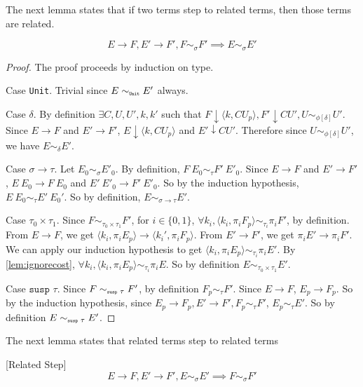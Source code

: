 The next lemma states that if two terms step to related terms, then those terms are related.
\begin{lemma}
  \label{lem:relatedstepback}
  \[
    E \to F, E' \to F', F \sim_\sigma F' \implies E \sim_\sigma E'
  \]
\end{lemma}
\begin{proof}
  The proof proceeds by induction on type.
  
  Case \texttt{Unit}. Trivial since $E \sim_{\texttt{\tiny{Unit}}} E'$ always.

  Case $\delta$.
  By definition $\exists C, U, U', k, k'$ such that $F \downarrow \langle k, C U_p \rangle, F' \downarrow C U', U \sim_{\phi[\delta]} U'$.
  Since $E \to F$ and $E' \to F'$, $E \downarrow \langle k, C U_p \rangle$ and $E' \downarrow C U'$.
  Therefore since $U \sim_{\phi[\delta]} U'$, we have $E \sim_\delta E'$.

  Case $\sigma \to \tau$.
  Let $E_0 \sim_\sigma E'_0$.
  By definition, $F\ E_0 \sim_\tau F'\ E'_0$.
  Since $E \to F$ and $E' \to F'$, $E\ E_0 \to F\ E_0$ and $E'\ E'_0 \to F'\ E'_0$.
  So by the induction hypothesis, $E\ E_0 \sim_\tau E'\ E_0'$.
  So by definition, $E \sim_{\sigma \to \tau} E'$.

  Case $\tau_0 \times \tau_1$.
  Since $F \sim_{\tau_0 \times \tau_1} F'$, for $i\in\{0, 1\}$,  $\forall k_i, \langle k_i, \pi_i F_p \rangle \sim_{\tau_i} \pi_i F'$, by definition.
  From $E \to F$, we get $\langle k_i, \pi_i E_p \rangle \to \langle k_i', \pi_i F_p \rangle$.
  From $E' \to F'$, we get $\pi_i E' \to \pi_i F'$.
  We can apply our induction hypothesis to get $\langle k_i, \pi_i E_p \rangle \sim_{\tau_i} \pi_i E'$.
  By \ref{lem:ignorecost}, $\forall k_i, \langle k_i, \pi_i E_p \rangle \sim_{\tau_i} \pi_i E$.
  So by definition $E \sim_{\tau_0 \times \tau_1} E'$.

  Case $\texttt{susp }\tau$.
  Since $F \sim_{\texttt{\tiny{susp }}\tau} F'$, by definition $F_p \sim_\tau F'$.
  Since $E \to F$, $E_p \to F_p$.
  So by the induction hypothesis, since $E_p \to F_p, E' \to F', F_p \sim_\tau F'$, $E_p \sim_\tau E'$.
  So by definition $E \sim_{\texttt{\tiny{susp }}\tau} E'$.

\end{proof}

The next lemma states that related terms step to related terms

\begin{lemma}
  \label{lem:relatedstep}[Related Step]
  \[ E \to F, E' \to F', E \sim_\sigma E' \implies F \sim_\sigma F' \]
\end{lemma}

